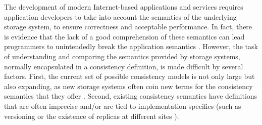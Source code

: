 \documentclass[journal,compsoc]{IEEEtran}
\begin{document}

   The development of modern Internet-based applications and services requires application developers to take into account the semantics of the 
underlying storage system, to ensure correctness and acceptable performance.
In fact, there is evidence that the lack of a good comprehension of these
semantics can lead programmers to unintendedly break the application semantics \cite{Bailis:2015:FCC:2723372.2737784}. 
However, the task of understanding and comparing the semantics provided by storage systems, normally encapsulated in a consistency definition, is made difficult by several factors. First, the current set of possible consistency models is not only large but also expanding, as new storage systems often coin new terms for the consistency semantics that they offer \cite{Cooper:2008:PYH:1454159.1454167, Lloyd:2011:DSE:2043556.2043593, Lakshman:2010:CDS:1773912.1773922}.
Second, existing consistency semantics have definitions that are often imprecise and/or are tied to implementation specifics (such as versioning \cite{DBLP:conf/icde/AdyaLO00} or the existence of replicas at different sites \cite{Li:2012:MGS:2387880.2387906}).
\end{document}
